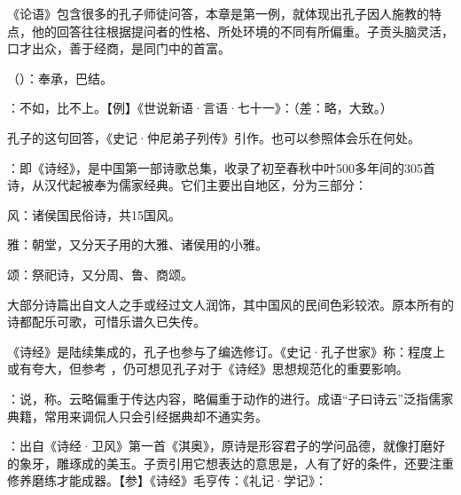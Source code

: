 {
《论语》包含很多的孔子师徒问答，本章是第一例，就体现出孔子因人施教的特点，他的回答往往根据提问者的性格、所处环境的不同有所偏重。子贡头脑灵活，口才出众，善于经商，是同门中的首富。
\begin{lyitemize}
\item {}（）：奉承，巴结。
\item {}：不如，比不上。【例】《世说新语·言语·七十一》：（差：略，大致。）

孔子的这句回答，《史记·仲尼弟子列传》引作。也可以参照体会乐在何处。

\item {}：即《诗经》，是中国第一部诗歌总集，收录了初至春秋中叶500多年间的305首诗，从汉代起被奉为儒家经典。它们主要出自地区，分为三部分：
\begin{lyitemize}
\item 风：诸侯国民俗诗，共15国风。
\item 雅：朝堂，又分天子用的大雅、诸侯用的小雅。
\item 颂：祭祀诗，又分周、鲁、商颂。
\end{lyitemize}
大部分诗篇出自文人之手或经过文人润饰，其中国风的民间色彩较浓。原本所有的诗都配乐可歌，可惜乐谱久已失传。%

《诗经》是陆续集成的，孔子也参与了编选修订。《史记·孔子世家》称：程度上或有夸大，但参考 ，仍可想见孔子对于《诗经》思想规范化的重要影响。

\item {}：说，称。云略偏重于传达内容，略偏重于动作的进行。成语“子曰诗云”泛指儒家典籍，常用来调侃人只会引经据典却不通实务。
\item {}：出自《诗经·卫风》第一首《淇奥》，原诗是形容君子的学问品德，就像打磨好的象牙，雕琢成的美玉。子贡引用它想表达的意思是，人有了好的条件，还要注重修养磨练才能成器。【参】《诗经》毛亨传：《礼记·学记》：%


\end{lyitemize}}

